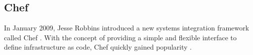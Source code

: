 %			
%			
%			


\subsection{Chef}

In January 2009, Jesse Robbins introduced a new systems integration framework called Chef \cite{chefcomannouncement} \cite{mittechreviewrobbins}. With the concept of providing a simple and flexible interface to define infrastructure as code, Chef quickly gained popularity \cite{pandey2012investigating}.


